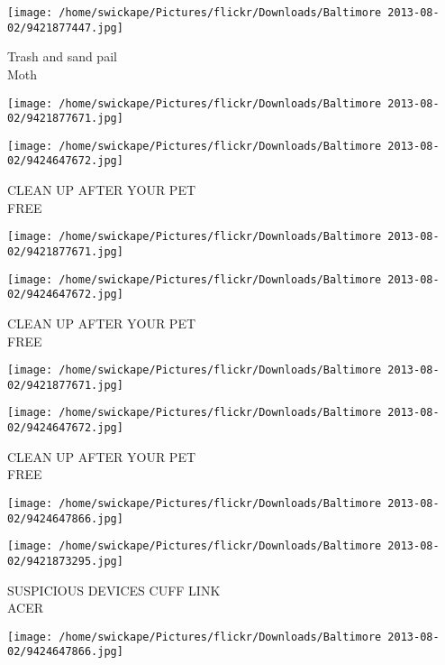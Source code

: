 \documentclass[10pt,letterpaper]{article}
\begin{document}
\vspace{0.25in}
\texttt{[image: /home/swickape/Pictures/flickr/Downloads/Baltimore 2013-08-02/9421877447.jpg]}

Trash and sand pail\\
Moth\\
\pagebreak

\texttt{[image: /home/swickape/Pictures/flickr/Downloads/Baltimore 2013-08-02/9421877671.jpg]}

\vspace{0.25in}
\texttt{[image: /home/swickape/Pictures/flickr/Downloads/Baltimore 2013-08-02/9424647672.jpg]}

CLEAN UP AFTER YOUR PET\\
FREE\\
\pagebreak

\texttt{[image: /home/swickape/Pictures/flickr/Downloads/Baltimore 2013-08-02/9421877671.jpg]}

\vspace{0.25in}
\texttt{[image: /home/swickape/Pictures/flickr/Downloads/Baltimore 2013-08-02/9424647672.jpg]}

CLEAN UP AFTER YOUR PET\\
FREE\\
\pagebreak

\texttt{[image: /home/swickape/Pictures/flickr/Downloads/Baltimore 2013-08-02/9421877671.jpg]}

\vspace{0.25in}
\texttt{[image: /home/swickape/Pictures/flickr/Downloads/Baltimore 2013-08-02/9424647672.jpg]}

CLEAN UP AFTER YOUR PET\\
FREE\\
\pagebreak

\texttt{[image: /home/swickape/Pictures/flickr/Downloads/Baltimore 2013-08-02/9424647866.jpg]}

\vspace{0.25in}
\texttt{[image: /home/swickape/Pictures/flickr/Downloads/Baltimore 2013-08-02/9421873295.jpg]}

SUSPICIOUS DEVICES CUFF LINK\\
ACER\\
\pagebreak

\texttt{[image: /home/swickape/Pictures/flickr/Downloads/Baltimore 2013-08-02/9424647866.jpg]}
\end{document}
